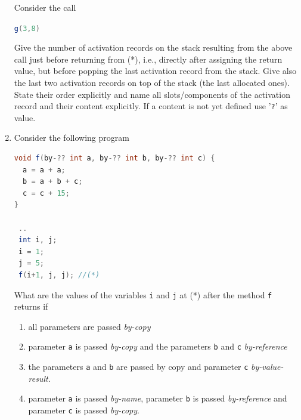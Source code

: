 \documentclass{article}
\begin{document}
\begin{enumerate}
Consider the call 
\begin{center}
  \lstinline[language=Java, columns=flexible]{g(3,8)} 
\end{center}
Give the number of activation records on the stack resulting from the
above call just before returning from (*), i.e., directly after
assigning the return value, but before popping the last activation
record from the stack. Give also the last two activation records on
top of the stack (the last allocated ones). State their order
explicitly and name all slots/components of the activation record and
their content explicitly. If a content is not yet defined use
'\texttt{?}' as value. 
\item Consider the following program
\begin{lstlisting}[language=Java, columns=flexible] 
void f(by-?? int a, by-?? int b, by-?? int c) {
  a = a + a;
  b = a + b + c;
  c = c + 15;
}

 ..
 int i, j;
 i = 1; 
 j = 5;
 f(i+1, j, j); //(*)
\end{lstlisting}

What are the values of the variables \lstinline!i! and \lstinline!j!
at (*) after the method \lstinline!f! returns if
\begin{enumerate}
  \item all parameters are passed \emph{by-copy}
  \item parameter \lstinline!a! is passed \emph{by-copy} and
    the parameters \lstinline!b! and \lstinline!c! \emph{by-reference}
  \item the parameters \lstinline!a! and \lstinline!b! are passed by
    copy and parameter \lstinline!c! \emph{by-value-result}. 
  \item parameter \lstinline!a! is passed \emph{by-name}, parameter
    \lstinline!b! is passed \emph{by-reference} and parameter
    \lstinline!c! is passed \emph{by-copy}.
\end{enumerate} 
\end{enumerate}
\end{document}
